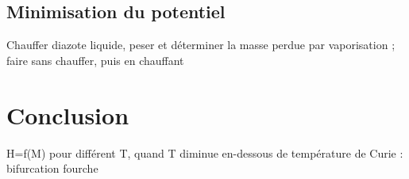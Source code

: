 \subsection{Minimisation du potentiel}



\begin{experience}
	Chauffer diazote liquide, peser et déterminer la masse perdue par vaporisation ; faire sans chauffer, puis en chauffant
\end{experience}



\section*{Conclusion}

H=f(M) pour différent T, quand T diminue en-dessous de température de Curie : bifurcation fourche



